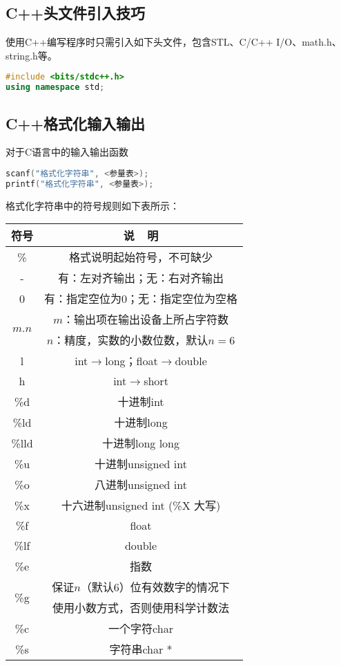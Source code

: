 \subsection{C++头文件引入技巧}

使用C++编写程序时只需引入如下头文件，包含STL、C/C++ I/O、math.h、string.h等。

\begin{lstlisting}[language=c++]
#include <bits/stdc++.h>
using namespace std;
\end{lstlisting}

\subsection{C++格式化输入输出}

对于C语言中的输入输出函数

\begin{lstlisting}[language=c]
scanf("格式化字符串", <参量表>);
printf("格式化字符串", <参量表>);
\end{lstlisting}

格式化字符串中的符号规则如下表所示：

\begin{table}[htbp]
	\centering
	\begin{tabular}{cc}
		\hline
		\textbf{符号} & \textbf{说~~明} \\
		\hline
		\hline
		\% & 格式说明起始符号，不可缺少 \\
		\hline
		- & 有：左对齐输出；无：右对齐输出 \\
		\hline
		0 & 有：指定空位为0；无：指定空位为空格 \\
		\hline
		\multirow{2}{*}{$m.n$} & $m$：输出项在输出设备上所占字符数 \\
		& $n$：精度，实数的小数位数，默认$n=6$ \\
		\hline
		l & int$\rightarrow$long；float$\rightarrow$double \\
		\hline
		h & int$\rightarrow$short \\
		\hline
		\hline
		\%d & 十进制int \\
		\hline
		\%ld & 十进制long \\
		\hline
		\%lld & 十进制long long \\
		\hline
		\%u & 十进制unsigned int \\
		\hline
		\%o & 八进制unsigned int \\
		\hline
		\%x & 十六进制unsigned int (\%X 大写) \\
		\hline
		\%f & float\\
		\hline
		\%lf & double\\
		\hline
		\%e & 指数\\
		\hline
		\multirow{2}{*}{\%g} & 保证$n$（默认6）位有效数字的情况下 \\
		&使用小数方式，否则使用科学计数法 \\
		\hline
		\hline
		\%c & 一个字符char \\
		\hline
		\%s & 字符串char * \\
		\hline
	\end{tabular}
\end{table}

